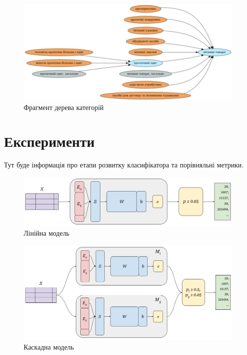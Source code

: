 \documentclass[fleqn,12pt,a4paper]{report}
\numberwithin{equation}{chapter}
\numberwithin{figure}{chapter}
\numberwithin{table}{chapter}
\numberwithin{footnote}{chapter}
\numberwithin{figure}{section}
\begin{document}
    \noindent
    \begin{figure}[ht]
        \includegraphics[width=\textwidth]{images/catify-category-tree}
        \caption{Фрагмент дерева категорій}
    \end{figure}

    \newpage


    \section{Експерименти}\label{sec:section1.4}

    Тут буде інформація про етапи розвитку класифікатора та порівняльні метрики.

    \noindent
    \begin{figure}[ht]
        \includegraphics[width=\textwidth]{images/catify-linear-model}
        \caption{Лінійна модель}
    \end{figure}

    \noindent
    \begin{figure}[ht]
        \includegraphics[width=\textwidth]{images/catify-cascading-model}
        \caption{Каскадна модель}
    \end{figure}
\end{document}
